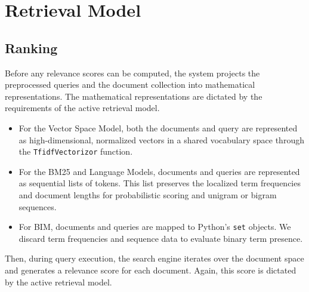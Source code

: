 \clearpage
\section*{Retrieval Model}
{}

\subsection*{Ranking}
{}

Before any relevance scores can be computed, the system projects the 
preprocessed queries and the document collection into mathematical 
representations. The mathematical representations are dictated by the 
requirements of the active retrieval model. 

\begin{itemize}
    \item   For the Vector Space Model, both the documents and query are 
            represented as high-dimensional, normalized vectors in a 
            shared vocabulary space through the \texttt{TfidfVectorizor}
            function.
    \item   For the BM25 and Language Models, documents and queries are 
            represented as sequential lists of tokens. This list preserves 
            the localized term frequencies and document lengths for 
            probabilistic scoring and unigram or bigram sequences.
    \item   For BIM, documents and queries are mapped to Python's \texttt{set}
            objects. We discard term frequencies and sequence data to 
            evaluate binary term presence.
\end{itemize}

Then, during query execution, the search engine iterates over the document 
space and generates a relevance score for each document. Again, this score 
is dictated by the active retrieval model.

